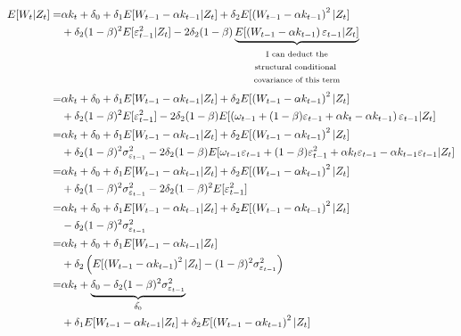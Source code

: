 \documentclass[
  letterpaper,
  DIV=11,
  numbers=noendperiod]{scrartcl}
\begin{document}
\[
\begin{aligned}
E[W_t|Z_t] =&\alpha k_t + \delta_0 + \delta_1 E[W_{t-1}-\alpha k_{t-1}|Z_t]+ \delta_2 E[\left(W_{t-1}-\alpha k_{t-1}\right)^2|Z_t]\\
    &+ \delta_2(1-\beta)^2E[\varepsilon_{t-1}^2|Z_t] - 2\delta_2(1-\beta)\underbrace{E[\left(W_{t-1}-\alpha k_{t-1}\right)\varepsilon_{t-1}|Z_t]}_{\begin{array}{c} \text{\scriptsize I can deduct the} \\ \text{\scriptsize structural conditional } \\ \text{\scriptsize covariance of this term} \end{array}}\\
    =&\alpha k_t + \delta_0 + \delta_1 E[W_{t-1}-\alpha k_{t-1}|Z_t]+ \delta_2 E[\left(W_{t-1}-\alpha k_{t-1}\right)^2|Z_t]\\
    &+ \delta_2(1-\beta)^2E[\varepsilon_{t-1}^2] - 2\delta_2(1-\beta)E[\left(\omega_{t-1}+(1-\beta)\varepsilon_{t-1}+\alpha k_t-\alpha k_{t-1}\right)\varepsilon_{t-1}|Z_t]\\
    =&\alpha k_t + \delta_0 + \delta_1 E[W_{t-1}-\alpha k_{t-1}|Z_t]+ \delta_2 E[\left(W_{t-1}-\alpha k_{t-1}\right)^2|Z_t]\\
    &+ \delta_2(1-\beta)^2\sigma_{\varepsilon_{t-1}}^2 - 2\delta_2(1-\beta)E[\omega_{t-1}\varepsilon_{t-1}+(1-\beta)\varepsilon_{t-1}^2+\alpha k_t\varepsilon_{t-1}-\alpha k_{t-1}\varepsilon_{t-1}|Z_t]\\
    =&\alpha k_t + \delta_0 + \delta_1 E[W_{t-1}-\alpha k_{t-1}|Z_t]+ \delta_2 E[\left(W_{t-1}-\alpha k_{t-1}\right)^2|Z_t]\\
    &+ \delta_2(1-\beta)^2\sigma_{\varepsilon_{t-1}}^2 - 2\delta_2(1-\beta)^2E[\varepsilon_{t-1}^2]\\
    =&\alpha k_t + \delta_0 + \delta_1 E[W_{t-1}-\alpha k_{t-1}|Z_t]+ \delta_2 E[\left(W_{t-1}-\alpha k_{t-1}\right)^2|Z_t]\\
    &- \delta_2(1-\beta)^2\sigma_{\varepsilon_{t-1}}^2\\
    =&\alpha k_t + \delta_0+ \delta_1 E[W_{t-1}-\alpha k_{t-1}|Z_t]\\
    & + \delta_2 \left(E[\left(W_{t-1}-\alpha k_{t-1}\right)^2|Z_t]-(1-\beta)^2\sigma_{\varepsilon_{t-1}}^2\right)\\
    =&\alpha k_t + \underbrace{\delta_0 - \delta_2(1-\beta)^2\sigma_{\varepsilon_{t-1}}^2}_{\tilde{\delta_0}}\\
    &+ \delta_1 E[W_{t-1}-\alpha k_{t-1}|Z_t]+ \delta_2 E[\left(W_{t-1}-\alpha k_{t-1}\right)^2|Z_t]\\
\end{aligned}
\]
\end{document}
